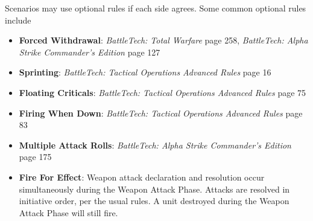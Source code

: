 Scenarios may use optional rules if each side agrees.
Some common optional rules include

\begin{itemize}

\item {\bfseries Forced Withdrawal}: \emph{BattleTech: Total Warfare} page 258, \emph{BattleTech: Alpha Strike Commander's Edition} page 127

\item {\bfseries Sprinting}: \emph{BattleTech: Tactical Operations Advanced Rules} page 16

\item {\bfseries Floating Criticals}: \emph{BattleTech: Tactical Operations Advanced Rules} page 75

\item {\bfseries Firing When Down}: \emph{BattleTech: Tactical Operations Advanced Rules} page 83

\item {\bfseries Multiple Attack Rolls}: \emph{BattleTech: Alpha Strike Commander's Edition} page 175

\item {\bfseries Fire For Effect}: Weapon attack declaration and resolution occur simultaneously during the Weapon Attack Phase.
Attacks are resolved in initiative order, per the usual rules.
A unit destroyed during the Weapon Attack Phase will still fire.

\end{itemize}
